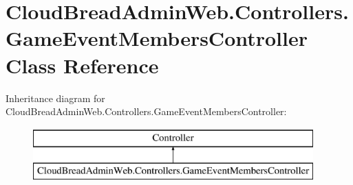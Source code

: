 \hypertarget{class_cloud_bread_admin_web_1_1_controllers_1_1_game_event_members_controller}{}\section{Cloud\+Bread\+Admin\+Web.\+Controllers.\+Game\+Event\+Members\+Controller Class Reference}
\label{class_cloud_bread_admin_web_1_1_controllers_1_1_game_event_members_controller}
Inheritance diagram for Cloud\+Bread\+Admin\+Web.\+Controllers.\+Game\+Event\+Members\+Controller\+:\begin{figure}[H]
\begin{center}
\leavevmode
\includegraphics[height=2.000000cm]{class_cloud_bread_admin_web_1_1_controllers_1_1_game_event_members_controller}
\end{center}
\end{figure}
